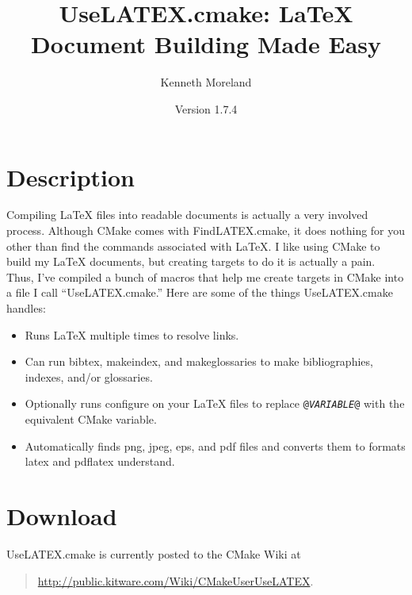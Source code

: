 \documentclass{article}
\newcommand{\UseLATEXVersion}{1.7.4}
\newcommand*{\textfile}[1]{\textsf{#1}}
\newcommand*{\textprog}[1]{\textfile{#1}}
\newcommand*{\textcmake}[1]{\texttt{#1}}
\newcommand*{\textvar}[1]{\textit{#1}}
\newcommand*{\UseLATEX}{\textfile{UseLATEX.cmake}\xspace}
\newcommand*{\latex}{\LaTeX\xspace}
\begin{document}
  \sloppy

  \title{UseLATEX.cmake: \latex Document Building Made Easy}
  \author{Kenneth Moreland}
  \date{Version \UseLATEXVersion}
  \maketitle

  \tableofcontents


  \section{Description}
  \label{sec:Description}

  Compiling \latex files into readable documents is actually a very
  involved process. Although CMake comes with \textfile{FindLATEX.cmake},
  it does nothing for you other than find the commands associated with
  \latex. I like using CMake to build my \latex documents, but creating
  targets to do it is actually a pain. Thus, I've compiled a bunch of
  macros that help me create targets in CMake into a file I call
  ``\UseLATEX.'' Here are some of the things \UseLATEX handles:

  \begin{itemize}
  \item Runs \latex multiple times to resolve links. 
  \item Can run \textprog{bibtex}, \textprog{makeindex}, and
    \textprog{makeglossaries} to make bibliographies, indexes, and/or
    glossaries.
  \item Optionally runs configure on your \latex files to replace
    \textcmake{@\textvar{VARIABLE}@} with the equivalent CMake variable.
  \item Automatically finds png, jpeg, eps, and pdf files and converts them
    to formats \textprog{latex} and \textprog{pdflatex} understand.
  \end{itemize}


  \section{Download}
  \label{sec:Download}

  \UseLATEX is currently posted to the CMake Wiki at
  \begin{quote}
    \href{http://public.kitware.com/Wiki/CMakeUserUseLATEX}{http://public.kitware.com/Wiki/CMakeUserUseLATEX}.
  \end{quote}
\end{document}

